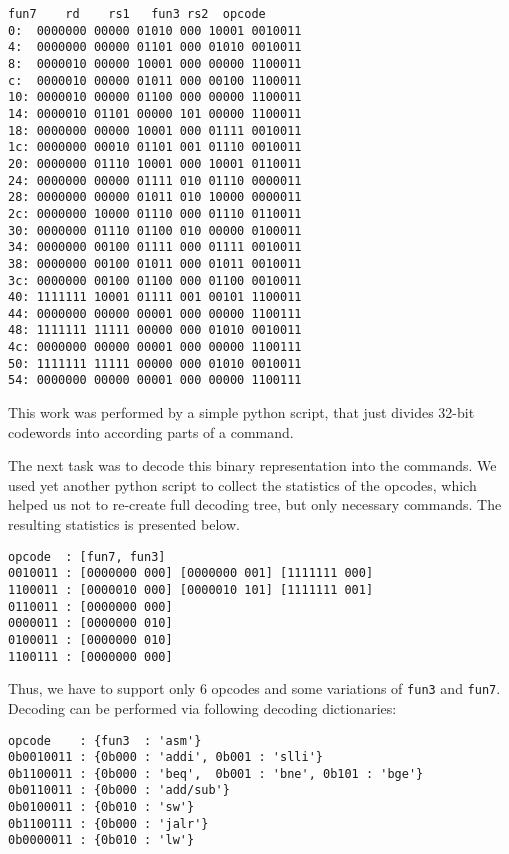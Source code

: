 \documentclass[a4paper]{article}
\begin{document}
\begin{lstlisting}[language=Ant, caption=Binary command representation]
    fun7    rd    rs1   fun3 rs2  opcode
0:	0000000 00000 01010 000 10001 0010011
4:	0000000 00000 01101 000 01010 0010011
8:	0000010 00000 10001 000 00000 1100011
c:	0000010 00000 01011 000 00100 1100011
10:	0000010 00000 01100 000 00000 1100011
14:	0000010 01101 00000 101 00000 1100011
18:	0000000 00000 10001 000 01111 0010011
1c:	0000000 00010 01101 001 01110 0010011
20:	0000000 01110 10001 000 10001 0110011
24:	0000000 00000 01111 010 01110 0000011
28:	0000000 00000 01011 010 10000 0000011
2c:	0000000 10000 01110 000 01110 0110011
30:	0000000 01110 01100 010 00000 0100011
34:	0000000 00100 01111 000 01111 0010011
38:	0000000 00100 01011 000 01011 0010011
3c:	0000000 00100 01100 000 01100 0010011
40:	1111111 10001 01111 001 00101 1100011
44:	0000000 00000 00001 000 00000 1100111
48:	1111111 11111 00000 000 01010 0010011
4c:	0000000 00000 00001 000 00000 1100111
50:	1111111 11111 00000 000 01010 0010011
54:	0000000 00000 00001 000 00000 1100111
\end{lstlisting}

This work was performed by a simple python script, that just divides 32-bit codewords into according parts of a command.

The next task was to decode this binary representation into the commands. We used yet another python script to collect the statistics of the opcodes, which helped us not to re-create full decoding tree, but only necessary commands. The resulting statistics is presented below.

\begin{lstlisting}[language=Ant, caption=Opcode statistics]
opcode  : [fun7, fun3]
0010011 : [0000000 000] [0000000 001] [1111111 000]
1100011 : [0000010 000] [0000010 101] [1111111 001]
0110011 : [0000000 000]
0000011 : [0000000 010]
0100011 : [0000000 010]
1100111 : [0000000 000]
\end{lstlisting}

Thus, we have to support only 6 opcodes and some variations of \texttt{fun3} and \texttt{fun7}.  Decoding can be performed via following decoding dictionaries:

\begin{lstlisting}[language=Ant, caption=Command decoding]
opcode    : {fun3  : 'asm'}
0b0010011 : {0b000 : 'addi', 0b001 : 'slli'}
0b1100011 : {0b000 : 'beq',  0b001 : 'bne', 0b101 : 'bge'}
0b0110011 : {0b000 : 'add/sub'}
0b0100011 : {0b010 : 'sw'}
0b1100111 : {0b000 : 'jalr'}
0b0000011 : {0b010 : 'lw'}
\end{lstlisting}
\end{document}
